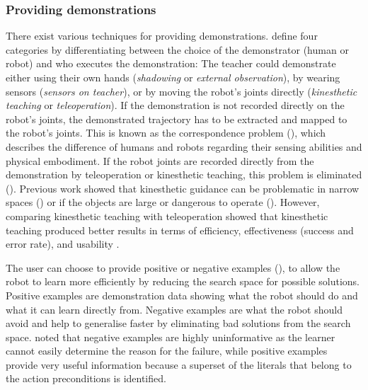 \subsubsection{Providing demonstrations}
There exist various techniques for providing demonstrations.
\cite{argall2009survey} define four categories by differentiating between the choice of the demonstrator (human or robot) and who executes the demonstration:
The teacher could demonstrate either using their own hands (\textit{shadowing} or \textit{external observation}), by wearing sensors (\textit{sensors on teacher}), or by moving the robot's joints directly (\textit{kinesthetic teaching} or \textit{teleoperation}).
If the demonstration is not recorded directly on the robot's joints, the demonstrated trajectory has to be extracted and mapped to the robot's joints.
This is known as the correspondence problem (\cite{nehaniv2002correspondence}), which describes the difference of humans and robots regarding their sensing abilities and physical embodiment.
If the robot joints are recorded directly from the demonstration by teleoperation or kinesthetic teaching, this problem is eliminated (\cite{chernova2014robot}).
Previous work showed that kinesthetic guidance can be problematic in narrow spaces (\cite{wrede2013user}) or if the objects are large or dangerous to operate (\cite{chernova2014robot}).
However, comparing kinesthetic teaching with teleoperation showed that kinesthetic teaching produced better results in terms of efficiency, effectiveness (success and error rate), and usability \cite{fischer2016comparison,chernova2014robot,akgun2011robot}.


The user can choose to provide positive or negative examples (\cite{grollman2012robot}), to allow the robot to learn more efficiently by reducing the search space for possible solutions.
Positive examples are demonstration data showing what the robot should do and what it can learn directly from. %
Negative examples are what the robot should avoid and help to generalise faster by eliminating bad solutions from the search space. %
\cite{walsh2010efficient} noted that negative examples are highly uninformative as the learner cannot easily determine the reason for the failure, while positive examples provide very useful information because a superset of the literals that belong to the action preconditions is identified.

